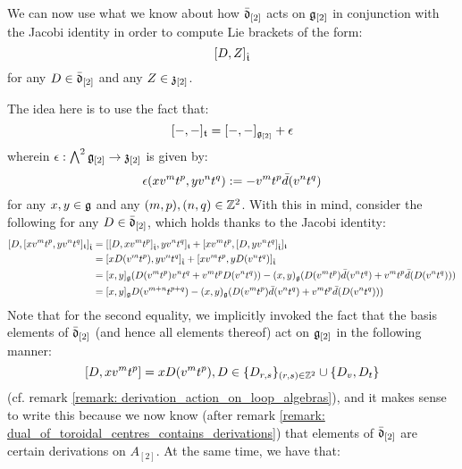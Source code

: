             \begin{remark} \label{remark: derivation_action_on_toroidal_centres}
                We can now use what we know about how $\bar{\mathfrak{d}}_{[2]}$ acts on $\mathfrak{g}_{[2]}$ in conjunction with the Jacobi identity in order to compute Lie brackets of the form:
                    $$[D, Z]_{\hat{\mathfrak{t}}}$$
                for any $D \in \bar{\mathfrak{d}}_{[2]}$ and any $Z \in \mathfrak{z}_{[2]}$.

                The idea here is to use the fact that:
                    $$[-, -]_{\mathfrak{t}} = [-, -]_{\mathfrak{g}_{[2]}} + \epsilon$$
                wherein $\epsilon: \bigwedge^2 \mathfrak{g}_{[2]} \to \mathfrak{z}_{[2]}$ is given by:
                    $$\epsilon(x v^m t^p, y v^n t^q) := -v^m t^p \bar{d}(v^n t^q)$$
                for any $x, y \in \mathfrak{g}$ and any $(m, p), (n, q) \in \mathbb{Z}^2$. With this in mind, consider the following for any $D \in \bar{\mathfrak{d}}_{[2]}$, which holds thanks to the Jacobi identity:
                    $$
                        \begin{aligned}
                            [ D, [x v^m t^p, y v^n t^q]_{\t} ]_{\hat{\t}} & = [ [D, x v^m t^p]_{\hat{\t}}, y v^n t^q ]_{\t} + [ x v^m t^p, [D, y v^n t^q]_{\hat{\t}} ]_{\t}
                            \\
                            & = [x D(v^m t^p), y v^n t^q]_{\hat{\t}} + [x v^m t^p, y D(v^n t^q)]_{\hat{\t}}
                            \\
                            & = [x, y]_{\g} (D(v^m t^p) v^n t^q + v^m t^p D(v^n t^q)) - (x, y)_{\g} ( D(v^m t^p) \bar{d}(v^n t^q) + v^m t^p \bar{d}(D(v^n t^q)) )
                            \\
                            & = [x, y]_{\g} D(v^{m + n} t^{p + q}) - (x, y)_{\g} ( D(v^m t^p) \bar{d}(v^n t^q) + v^m t^p \bar{d}(D(v^n t^q)) )
                        \end{aligned}
                    $$
                Note that for the second equality, we implicitly invoked the fact that the basis elements of $\bar{\mathfrak{d}}_{[2]}$ (and hence all elements thereof) act on $\mathfrak{g}_{[2]}$ in the following manner:
                    $$[D, x v^m t^p] = x D(v^m t^p), D \in \{D_{r, s}\}_{(r, s) \in \mathbb{Z}^2} \cup \{D_v, D_t\}$$
                (cf. remark \ref{remark: derivation_action_on_loop_algebras}), and it makes sense to write this because we now know (after remark \ref{remark: dual_of_toroidal_centres_contains_derivations}) that elements of $\bar{\mathfrak{d}}_{[2]}$ are certain derivations on $A_{[2]}$. At the same time, we have that:
                    $$
$$
\end{remark}
